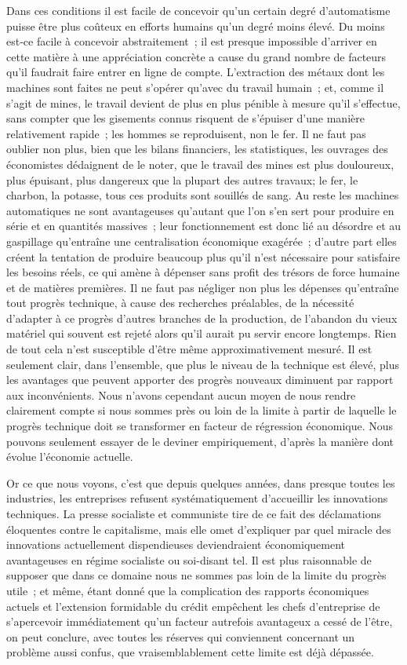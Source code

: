 \documentclass[french,twoside]{book} %
\begin{document}
Dans ces conditions il est facile de concevoir qu'un certain degré d'automatisme puisse être plus coûteux en efforts humains qu'un degré moins élevé. Du moins est-ce facile à concevoir abstraitement ; il est presque impossible d'arriver en cette matière à une appréciation concrète a cause du grand nombre de facteurs qu'il faudrait faire entrer en ligne de compte. L'extraction des métaux dont les machines sont faites ne peut s'opérer qu'avec du travail humain ; et, comme il s'agit de mines, le travail devient de plus en plus pénible à mesure qu'il s'effectue, sans compter que les gisements connus risquent de s'épuiser d'une manière relativement rapide ; les hommes se reproduisent, non le fer. Il ne faut pas oublier non plus, bien que les bilans financiers, les statistiques, les ouvrages des économistes dédaignent de le noter, que le travail des mines est plus douloureux, plus épuisant, plus dangereux que la plupart des autres travaux; le fer, le charbon, la potasse, tous ces produits sont souillés de sang. Au reste les machines automatiques ne sont avantageuses qu'autant que l'on s'en sert pour produire en série et en quantités massives ; leur fonctionnement est donc lié au désordre et au gaspillage qu'entraîne une centralisation économique exagérée ; d'autre part elles créent la tentation de produire beaucoup plus qu'il n'est nécessaire pour satisfaire les besoins réels, ce qui amène à dépenser sans profit des trésors de force humaine et de matières premières. Il ne faut pas négliger non plus les dépenses qu'entraîne tout progrès technique, à cause des recherches préalables, de la nécessité d'adapter à ce progrès d'autres branches de la production, de l'abandon du vieux matériel qui souvent est rejeté alors qu'il aurait pu servir encore longtemps. Rien de tout cela n'est susceptible d'être même approximativement mesuré. Il est seulement clair, dans l'ensemble, que plus le niveau de la technique est élevé, plus les avantages que peuvent apporter des progrès nouveaux diminuent par rapport aux inconvénients. Nous n'avons cependant aucun moyen de nous rendre clairement compte si nous sommes près ou loin de la limite à partir de laquelle le progrès technique doit se transformer en facteur de régression économique. Nous pouvons seulement essayer de le deviner empiriquement, d'après la manière dont évolue l'économie actuelle.\par
Or ce que nous voyons, c'est que depuis quelques années, dans presque toutes les industries, les entreprises refusent systématiquement d'accueillir les innovations techniques. La presse socialiste et communiste tire de ce fait des déclamations éloquentes contre le capitalisme, mais elle omet d'expliquer par quel miracle des innovations actuellement dispendieuses deviendraient économiquement avantageuses en régime socialiste ou soi-disant tel. Il est plus raisonnable de supposer que dans ce domaine nous ne sommes pas loin de la limite du progrès utile ; et même, étant donné que la complication des rapports économiques actuels et l'extension formidable du crédit empêchent les chefs d'entreprise de s'apercevoir immédiatement qu'un facteur autrefois avantageux a cessé de l'être, on peut conclure, avec toutes les réserves qui conviennent concernant un problème aussi confus, que vraisemblablement cette limite est déjà dépassée.\par
\end{document}
